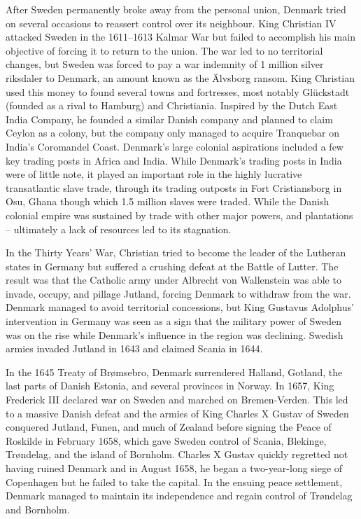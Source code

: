After Sweden permanently broke away from the personal union, Denmark
tried on several occasions to reassert control over its neighbour. King
Christian IV attacked Sweden in the 1611--1613 Kalmar War but failed to
accomplish his main objective of forcing it to return to the union. The
war led to no territorial changes, but Sweden was forced to pay a war
indemnity of 1 million silver riksdaler to Denmark, an amount known as
the Älvsborg ransom. King Christian used this money to found several
towns and fortresses, most notably Glückstadt (founded as a rival to
Hamburg) and Christiania. Inspired by the Dutch East India Company, he
founded a similar Danish company and planned to claim Ceylon as a
colony, but the company only managed to acquire Tranquebar on India's
Coromandel Coast. Denmark's large colonial aspirations included a few
key trading posts in Africa and India. While Denmark's trading posts in
India were of little note, it played an important role in the highly
lucrative transatlantic slave trade, through its trading outposts in
Fort Cristiansborg in Osu, Ghana though which 1.5 million slaves were
traded. While the Danish colonial empire was sustained by trade with
other major powers, and plantations -- ultimately a lack of resources
led to its stagnation.

In the Thirty Years' War, Christian tried to become the leader of the
Lutheran states in Germany but suffered a crushing defeat at the Battle
of Lutter. The result was that the Catholic army under Albrecht von
Wallenstein was able to invade, occupy, and pillage Jutland, forcing
Denmark to withdraw from the war. Denmark managed to avoid territorial
concessions, but King Gustavus Adolphus' intervention in Germany was
seen as a sign that the military power of Sweden was on the rise while
Denmark's influence in the region was declining. Swedish armies invaded
Jutland in 1643 and claimed Scania in 1644.

In the 1645 Treaty of Brømsebro, Denmark surrendered Halland, Gotland,
the last parts of Danish Estonia, and several provinces in Norway. In
1657, King Frederick III declared war on Sweden and marched on
Bremen-Verden. This led to a massive Danish defeat and the armies of
King Charles X Gustav of Sweden conquered Jutland, Funen, and much of
Zealand before signing the Peace of Roskilde in February 1658, which
gave Sweden control of Scania, Blekinge, Trøndelag, and the island of
Bornholm. Charles X Gustav quickly regretted not having ruined Denmark
and in August 1658, he began a two-year-long siege of Copenhagen but he
failed to take the capital. In the ensuing peace settlement, Denmark
managed to maintain its independence and regain control of Trøndelag and
Bornholm.

